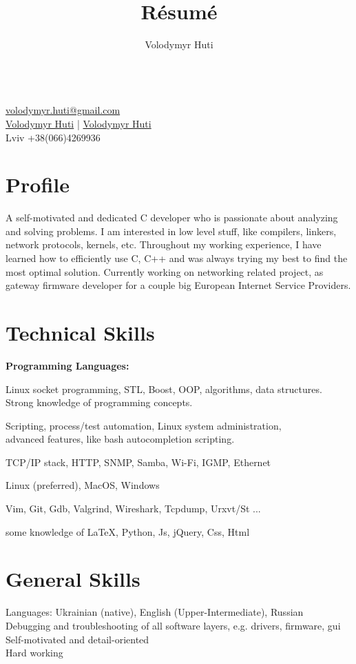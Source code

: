 \documentclass{article}
\author{Volodymyr Huti}
\title{R\'esum\'e}
\date{}
\makeatletter
\renewcommand{\maketitle}{
    \begin{center}
    {\huge\bfseries\theauthor}\\
    \vspace{.25em}
    \href{volodymyr.huti@gmail.com}{\faMailForward{} volodymyr.huti@gmail.com}\\
    \href{https://github.com/volodymyrhuti }{\faGithub{} Volodymyr Huti} |
    \href{https://www.linkedin.com/in/volodymyr-huti-b03a41156/}{\faLinkedinSquare{} Volodymyr Huti}\\
    Lviv +38(066)4269936 \\
    \end{center}
}
\makeatother
\begin{document}
\thispagestyle{empty}       %
\maketitle


\section{Profile}
A self-motivated and dedicated C developer who is passionate about analyzing and solving problems.
I am interested in low level stuff, like compilers, linkers, network protocols, kernels, etc.
Throughout my working experience, I have learned how to efficiently use C, C++  and was always trying
my best to find the most optimal solution. Currently working on networking related project, as gateway
firmware developer for a couple big European Internet Service Providers.

\section{Technical Skills}
\textbf{Programming Languages:}
\begin{description}[align=left,leftmargin=3.8cm,style=multiline]
\item[C/C++] Linux socket programming, STL, Boost, OOP, algorithms, data structures.\\
             Strong knowledge of programming concepts.
\item[Shell] Scripting, process/test automation, Linux system administration,\\
             advanced features, like bash autocompletion scripting.\\
\item[Networking:] TCP/IP stack, HTTP, SNMP, Samba, Wi-Fi, IGMP, Ethernet
\item[Operating System:] Linux (preferred), MacOS, Windows
\item[Development Tools:] Vim, Git, Gdb, Valgrind, Wireshark, Tcpdump, Urxvt/St ...
\item[General:] some knowledge of \LaTeX, Python, Js, jQuery, Css, Html
\end{description}

\section{General Skills}
Languages: Ukrainian (native), English (Upper-Intermediate), Russian\\
Debugging and troubleshooting of all software layers, e.g. drivers, firmware, gui\\
Self-motivated and detail-oriented\\
Hard working
\end{document}
